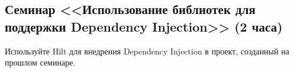 \subsection{Семинар <<Использование библиотек для поддержки Dependency Injection>> (2 часа)}

Используйте Hilt для внедрения Dependency Injection в проект, созданный на прошлом семинаре.

